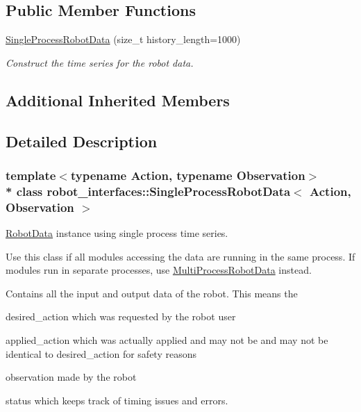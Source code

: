 \subsection*{Public Member Functions}
\begin{DoxyCompactItemize}
\item 
\hyperlink{classrobot__interfaces_1_1SingleProcessRobotData_adcb9896c90464e27fb1cd2f303ca7cef}{Single\+Process\+Robot\+Data} (size\+\_\+t history\+\_\+length=1000)
\begin{DoxyCompactList}\small\item\em Construct the time series for the robot data. \end{DoxyCompactList}\end{DoxyCompactItemize}
\subsection*{Additional Inherited Members}


\subsection{Detailed Description}
\subsubsection*{template$<$typename Action, typename Observation$>$\\*
class robot\+\_\+interfaces\+::\+Single\+Process\+Robot\+Data$<$ Action, Observation $>$}

\hyperlink{classrobot__interfaces_1_1RobotData}{Robot\+Data} instance using single process time series. 

Use this class if all modules accessing the data are running in the same process. If modules run in separate processes, use \hyperlink{classrobot__interfaces_1_1MultiProcessRobotData}{Multi\+Process\+Robot\+Data} instead.

Contains all the input and output data of the robot. This means the
\begin{DoxyItemize}
\item {\ttfamily desired\+\_\+action} which was requested by the robot user
\item {\ttfamily applied\+\_\+action} which was actually applied and may not be and may not be identical to desired\+\_\+action for safety reasons
\item {\ttfamily observation} made by the robot
\item {\ttfamily status} which keeps track of timing issues and errors.
\end{DoxyItemize}

